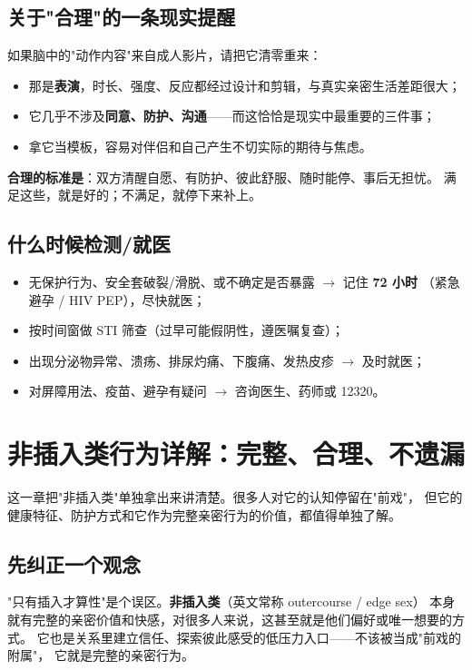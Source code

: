 \documentclass[12pt,UTF8,openany]{ctexbook}
\begin{document}
\section{关于"合理"的一条现实提醒}

如果脑中的"动作内容"来自成人影片，请把它清零重来：

\begin{itemize}[leftmargin=2em]
  \item 那是\textbf{表演}，时长、强度、反应都经过设计和剪辑，与真实亲密生活差距很大；
  \item 它几乎不涉及\textbf{同意、防护、沟通}——而这恰恰是现实中最重要的三件事；
  \item 拿它当模板，容易对伴侣和自己产生不切实际的期待与焦虑。
\end{itemize}

\textbf{合理的标准是}：双方清醒自愿、有防护、彼此舒服、随时能停、事后无担忧。
满足这些，就是好的；不满足，就停下来补上。

\section{什么时候检测/就医}

\begin{itemize}[leftmargin=2em]
  \item 无保护行为、安全套破裂/滑脱、或不确定是否暴露 $\to$ 记住 \textbf{72 小时}
        （紧急避孕 / HIV PEP），尽快就医；
  \item 按时间窗做 STI 筛查（过早可能假阴性，遵医嘱复查）；
  \item 出现分泌物异常、溃疡、排尿灼痛、下腹痛、发热皮疹 $\to$ 及时就医；
  \item 对屏障用法、疫苗、避孕有疑问 $\to$ 咨询医生、药师或 12320。
\end{itemize}

\chapter{非插入类行为详解：完整、合理、不遗漏}
\label{chap:outer}

这一章把"非插入类"单独拿出来讲清楚。很多人对它的认知停留在"前戏"，
但它的健康特征、防护方式和它作为完整亲密行为的价值，都值得单独了解。

\section{先纠正一个观念}

"只有插入才算性"是个误区。\textbf{非插入类}（英文常称 outercourse / edge sex）
本身就有完整的亲密价值和快感，对很多人来说，这甚至就是他们偏好或唯一想要的方式。
它也是关系里建立信任、探索彼此感受的低压力入口——不该被当成"前戏的附属"，
它就是完整的亲密行为。
\end{document}
